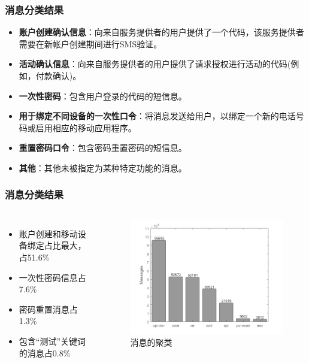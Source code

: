 \documentclass{beamer}
\begin{document}
\begin{frame}
\frametitle{\textbf{消息分类结果}}
\begin{itemize}
\item \textbf{账户创建确认信息}：向来自服务提供者的用户提供了一个代码，该服务提供者需要在新帐户创建期间进行SMS验证。
\item \textbf{活动确认信息}：向来自服务提供者的用户提供了请求授权进行活动的代码(例如，付款确认)。
\item \textbf{一次性密码}：包含用户登录的代码的短信息。
\item \textbf{用于绑定不同设备的一次性口令}：将消息发送给用户，以绑定一个新的电话号码或启用相应的移动应用程序。
\item \textbf{重置密码口令}：包含密码重置密码的短信息。
\item \textbf{其他}：其他未被指定为某种特定功能的消息。
\end{itemize}
\end{frame}

\begin{frame}
\frametitle{\textbf{消息分类结果}}
\begin{columns}
\footnotesize
\begin{itemize}
    \item 账户创建和移动设备绑定占比最大，占51.6\%
    \item 一次性密码信息占7.6\%
    \item 密码重置消息占1.3\%
    \item 包含“测试”关键词的消息占0.8\%
\end{itemize}

\begin{figure}[!t]
    \centering
    \includegraphics[width=1.1\textwidth]{beamer/figure4.png}
    \caption{消息的聚类}
    \label{figure3_OTT}
\end{figure}
\end{columns}
\end{frame}
\end{document}
